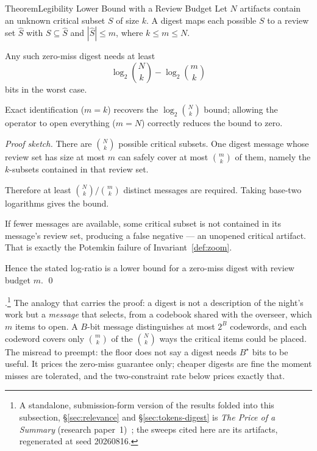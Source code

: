 \documentclass[11pt,a4paper]{article}
\theoremstyle{definition}
\theoremstyle{plain}
\begin{document}
%
\begin{pdclaim}{Theorem}{Legibility Lower Bound with a Review Budget}
\setlength{\parskip}{4pt plus 1pt}
\label{thm:lowerbound}
Let $N$ artifacts contain an unknown critical subset $S$ of size $k$. A digest
maps each possible $S$ to a review set $\hat S$ with $S\subseteq\hat S$ and
$|\hat S|\le m$, where $k\le m\le N$.

Any such zero-miss digest needs at least
\[
\log_2\!\binom{N}{k}-\log_2\!\binom{m}{k}
\]
bits in the worst case.

Exact identification ($m=k$) recovers the
$\log_2\binom Nk$ bound; allowing the operator to open everything ($m=N$) correctly
reduces the bound to zero.
\end{pdclaim}

\begin{proof}[Proof sketch]
\setlength{\parskip}{4pt plus 1pt}
There are $\binom Nk$ possible critical subsets. One digest message whose review
set has size at most $m$ can safely cover at most $\binom mk$ of them, namely the
$k$-subsets contained in that review set.

Therefore at least
$\binom Nk/\binom mk$ distinct messages are required. Taking base-two logarithms
gives the bound.

If fewer messages are available, some critical subset is not
contained in its message's review set, producing a
false negative --- an unopened critical artifact. That is exactly the Potemkin
failure of Invariant~\ref{def:zoom}.

Hence the stated log-ratio is a lower bound for a
zero-miss digest with review budget $m$. \qed
\end{proof}

\noindent\Verified.\footnote{A standalone, submission-form version of the
results folded into this subsection, \S\ref{sec:relevance} and
\S\ref{sec:tokens-digest} is \emph{The Price of a Summary} (research
paper~1)~\cite{paper1}; the sweeps cited here are its artifacts, regenerated at seed
20260816.} The analogy that carries the proof: a digest is not a description of the
night's work but a \emph{message} that selects, from a codebook shared with the
overseer, which $m$ items to open. A $B$-bit message distinguishes at most $2^B$
codewords, and each codeword covers only $\binom{m}{k}$ of the $\binom{N}{k}$ ways
the critical items could be placed. The misread to preempt: the floor does not say
a digest needs $B^\star$ bits to be useful. It prices the zero-miss guarantee only;
cheaper digests are fine the moment misses are tolerated, and the two-constraint
rate below prices exactly that.
\end{document}
